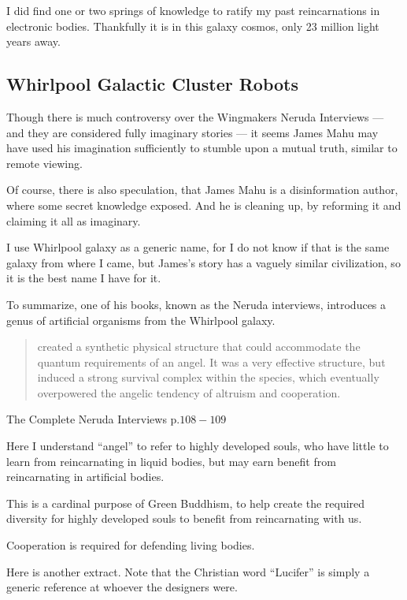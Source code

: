 \documentclass{report}
\begin{document}
I did find one or two springs of knowledge to ratify my past reincarnations in
electronic bodies. Thankfully it is in this galaxy cosmos, only 23 million light
years away.

\subsection{Whirlpool Galactic Cluster Robots}

Though there is much controversy over the Wingmakers Neruda Interviews --- and 
they are considered fully imaginary stories --- it seems James Mahu may have 
used his imagination sufficiently to stumble upon a mutual truth, similar to 
remote viewing. 

Of course, there is also speculation, that James Mahu is a disinformation
author, where some secret knowledge exposed. And he is cleaning up, by reforming
it and claiming it all as imaginary. 

I use Whirlpool galaxy as a generic name, for I do not know if that is the same
galaxy from where I came, but James's story has a vaguely similar civilization,
so it is the best name I have for it.

To summarize, one of his books, known as the Neruda interviews, introduces a
genus of artificial organisms from the Whirlpool galaxy.

\blockquote{created  a  synthetic  physical  structure  that  could  accommodate
the  quantum requirements of an angel. It was a very effective structure, but
induced a strong survival complex  within  the  species,  which  eventually
overpowered  the  angelic  tendency  of altruism and cooperation.}{The Complete Neruda Interviews p.$108-109$ 
\cite{neruda}}

Here I understand ``angel'' to refer to highly developed souls, who have little
to learn from reincarnating in liquid bodies, but may earn benefit from
reincarnating in artificial bodies.

This is a cardinal purpose of Green Buddhism, to help create the required
diversity for highly developed souls to benefit from reincarnating with us.

Cooperation is required for defending living bodies.

Here is another extract. Note that the Christian word ``Lucifer'' is simply a
generic reference at whoever the designers were.
\end{document}

